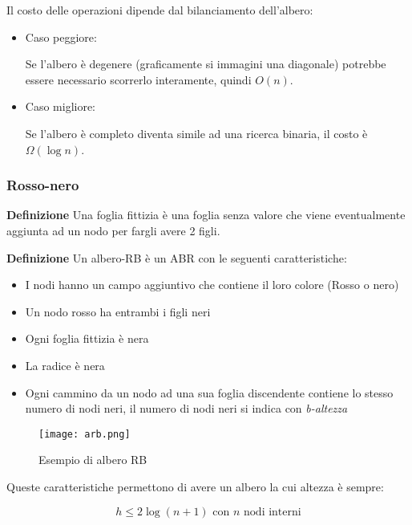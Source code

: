 \documentclass{article}
\begin{document}
\noindent Il costo delle operazioni dipende dal bilanciamento dell'albero:
\begin{itemize}
    \item Caso peggiore:

    Se l'albero è degenere (graficamente si immagini una diagonale) potrebbe essere necessario scorrerlo interamente, quindi $O(n)$.

    \item Caso migliore:

    Se l'albero è completo diventa simile ad una ricerca binaria, il costo è $\Omega(\log n)$.    
    
\end{itemize}

\newpage

\subsubsection{Rosso-nero}

\textbf{Definizione} Una foglia fittizia è una foglia senza valore che viene eventualmente aggiunta ad un nodo per fargli avere 2 figli.\newline

\noindent\textbf{Definizione} Un albero-RB è un ABR con le seguenti caratteristiche:
\begin{itemize}
    \item I nodi hanno un campo aggiuntivo che contiene il loro colore (Rosso o nero)
    \item Un nodo rosso ha entrambi i figli neri
    \item Ogni foglia fittizia è nera
    \item La radice è nera
    \item Ogni cammino da un nodo ad una sua foglia discendente contiene lo stesso numero di nodi neri, il numero di nodi neri si indica con \textit{b-altezza}
\end{itemize}

\begin{figure}[ht]
    \centering
    \texttt{[image: arb.png]}
    \caption{Esempio di albero RB}
    \label{fig:arb}
\end{figure}

\noindent Queste caratteristiche permettono di avere un albero la cui altezza è sempre:

$$h\leq2\log(n+1)\text{ con $n$ nodi interni}$$\newline

\newpage
\end{document}
